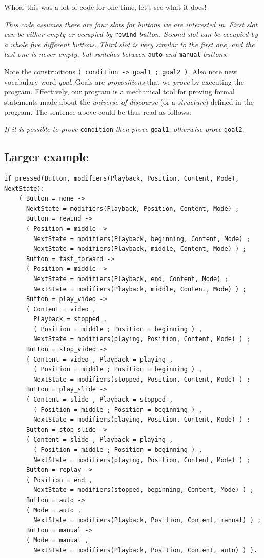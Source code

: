 \documentclass[11pt]{article}
\begin{document}
Whoa, this was a lot of code for one time, let's see what it does!

\emph{This code assumes there are four slots for buttons we are interested in.}
\emph{First slot can be either empty or occupied by} \texttt{rewind} \emph{button.  Second}
\emph{slot can be occupied by a whole five different buttons.  Third slot is}
\emph{very similar to the first one, and the last one is never empty, but switches}
\emph{between} \texttt{auto} \emph{and} \texttt{manual} \emph{buttons}.

Note the constructions \texttt{( condition -> goal1 ; goal2 )}. Also note new
vocabulary word \emph{goal}.  Goals are \emph{propositions} that we \emph{prove} by executing
the program.  Effectively, our program is a mechanical tool for proving formal
statements made about the \emph{universe of discourse} (or a \emph{structure}) defined
in the program.  The sentence above could be thus read as follows:

\emph{If it is possible to prove} \texttt{condition} \emph{then prove} \texttt{goal1}, \emph{otherwise}
\emph{prove} \texttt{goal2}.
\subsection{Larger example}
\label{sec-2-3}

\begin{verbatim}
if_pressed(Button, modifiers(Playback, Position, Content, Mode), NextState):-
    ( Button = none ->
      NextState = modifiers(Playback, Position, Content, Mode) ;
      Button = rewind ->
      ( Position = middle ->
        NextState = modifiers(Playback, beginning, Content, Mode) ;
        NextState = modifiers(Playback, middle, Content, Mode) ) ;
      Button = fast_forward ->
      ( Position = middle ->
        NextState = modifiers(Playback, end, Content, Mode) ;
        NextState = modifiers(Playback, middle, Content, Mode) ) ;
      Button = play_video ->
      ( Content = video ,
        Playback = stopped ,
        ( Position = middle ; Position = beginning ) ,
        NextState = modifiers(playing, Position, Content, Mode) ) ;
      Button = stop_video ->
      ( Content = video , Playback = playing ,
        ( Position = middle ; Position = beginning ) ,
        NextState = modifiers(stopped, Position, Content, Mode) ) ;
      Button = play_slide ->
      ( Content = slide , Playback = stopped ,
        ( Position = middle ; Position = beginning ) ,
        NextState = modifiers(playing, Position, Content, Mode) ) ;
      Button = stop_slide ->
      ( Content = slide , Playback = playing ,
        ( Position = middle ; Position = beginning ) ,
        NextState = modifiers(playing, Position, Content, Mode) ) ;
      Button = replay ->
      ( Position = end ,
        NextState = modifiers(stopped, beginning, Content, Mode) ) ;
      Button = auto ->
      ( Mode = auto ,
        NextState = modifiers(Playback, Position, Content, manual) ) ;
      Button = manual ->
      ( Mode = manual ,
        NextState = modifiers(Playback, Position, Content, auto) ) ).
\end{verbatim}
\end{document}
